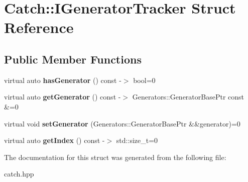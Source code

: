 \hypertarget{struct_catch_1_1_i_generator_tracker}{}\section{Catch\+:\+:I\+Generator\+Tracker Struct Reference}
\label{struct_catch_1_1_i_generator_tracker}
\subsection*{Public Member Functions}
\begin{DoxyCompactItemize}
\item 
\mbox{\label{struct_catch_1_1_i_generator_tracker_ae88084f9af27c8b9a5d5775b9c148498}} 
virtual auto {\bfseries has\+Generator} () const -\/$>$ bool=0
\item 
\mbox{\label{struct_catch_1_1_i_generator_tracker_a23be942fc51672598bfa02c678c3078a}} 
virtual auto {\bfseries get\+Generator} () const -\/$>$ Generators\+::\+Generator\+Base\+Ptr const \&=0
\item 
\mbox{\label{struct_catch_1_1_i_generator_tracker_a9945eff42219edc5a7071eebd8b0419e}} 
virtual void {\bfseries set\+Generator} (Generators\+::\+Generator\+Base\+Ptr \&\&generator)=0
\item 
\mbox{\label{struct_catch_1_1_i_generator_tracker_a2922f0d8bc7a732079eadbda78e30f79}} 
virtual auto {\bfseries get\+Index} () const -\/$>$ std\+::size\+\_\+t=0
\end{DoxyCompactItemize}


The documentation for this struct was generated from the following file\+:\begin{DoxyCompactItemize}
\item 
catch.\+hpp\end{DoxyCompactItemize}
